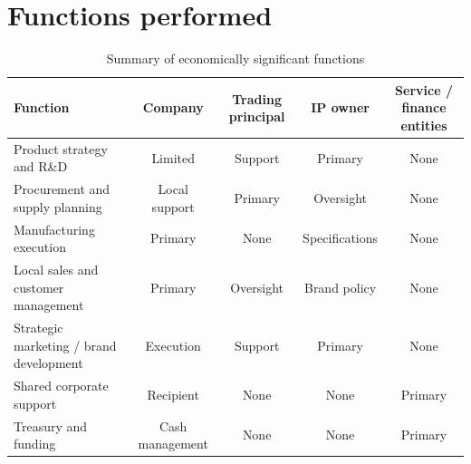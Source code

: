 \section{Functions performed}
\begin{table}[htbp]
  \centering
  \caption{Summary of economically significant functions}
  \small
  \begin{tabularx}{\textwidth}{@{}Y C C C C@{}}
    \toprule
    \textbf{Function} & \textbf{Company} & \textbf{Trading principal} &
      \textbf{IP owner} & \textbf{Service / finance entities}\\
    \midrule
    Product strategy and R\&D & Limited & Support & Primary & None\\
    Procurement and supply planning & Local support & Primary & Oversight & None\\
    Manufacturing execution & Primary & None & Specifications & None\\
    Local sales and customer management & Primary & Oversight & Brand policy & None\\
    Strategic marketing / brand development & Execution & Support & Primary & None\\
    Shared corporate support & Recipient & None & None & Primary\\
    Treasury and funding & Cash management & None & None & Primary\\
    \bottomrule
  \end{tabularx}
\end{table}
